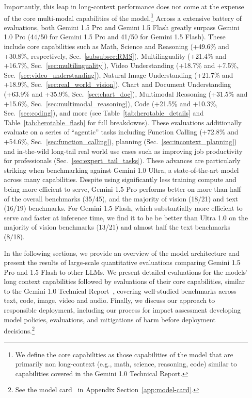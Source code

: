 Importantly, this leap in long-context performance does not come at the expense of the core multi-modal capabilities of the model.\footnote{We define the core capabilities as those capabilities of the model that are primarily non long-context (e.g., math, science, reasoning, code) similar to capabilities covered in the Gemini 1.0 Technical Report\cite{geminiteam2023gemini}.} Across a extensive battery of evaluations, both Gemini 1.5 Pro and Gemini 1.5 Flash greatly surpass Gemini 1.0 Pro (44/50 for Gemini 1.5 Pro and 41/50 for Gemini 1.5 Flash). These include core capabilities such as Math, Science and Reasoning (+49.6\% and +30.8\%, respectively, Sec.~\ref{subsubsec:RMS}), Multilinguality (+21.4\% and +16.7\%, Sec.~\ref{sec:multilinguality}), Video Understanding (+18.7\% and +7.5\%, Sec.~\ref{sec:video_understanding}), Natural Image Understanding (+21.7\% and +18.9\%, Sec.~\ref{sec:real_world_vision}), Chart and Document Understanding (+63.9\% and +35.9\%, Sec.~\ref{sec:chart_doc}), Multimodal Reasoning (+31.5\% and +15.6\%, Sec.~\ref{sec:multimodal_reasoning}), Code (+21.5\% and +10.3\%, Sec.~\ref{sec:coding}), and more (see Table~\ref{tab:herotable_details} and Table~\ref{tab:herotable_flash} for full breakdowns). These evaluations additionally evaluate on a series of ``agentic'' tasks including Function Calling (+72.8\% and +54.6\%, Sec.~\ref{sec:function_calling}), planning (Sec.~\ref{sec:incontext_planning}) and in-the-wild long-tail real world use cases such as improving job productivity for professionals (Sec.~\ref{sec:expert_tail_tasks}). These advances are particularly striking when benchmarking against Gemini 1.0 Ultra, a state-of-the-art model across many capabilities. Despite using significantly less training compute and being more efficient to serve, Gemini 1.5 Pro performs better on more than half of the overall benchmarks (35/45), and the majority of vision (18/21) and text (16/19) benchmarks. For Gemini 1.5 Flash, which substantially more efficient to serve and faster at inference time, we find it to be be better than Ultra 1.0 on the majority of vision benchmarks (13/21) and almost half the text benchmarks (8/18).

In the following sections, we provide an overview of the model architecture and present the results of large-scale quantitative evaluations comparing Gemini 1.5 Pro and 1.5 Flash to other LLMs. We present detailed evaluations for the models' long context capabilities followed by evaluations of their core capabilities, similar to the Gemini 1.0 Technical Report~\cite{geminiteam2023gemini}, covering well-studied benchmarks across text, code, image, video and audio. Finally, we discuss our approach to responsible deployment, including our process for impact assessment developing model policies, evaluations, and mitigations of harm before deployment decisions.\footnote{See the model card~\citep{mitchell-2019-model} in Appendix Section~\ref{app:model-card}.}

